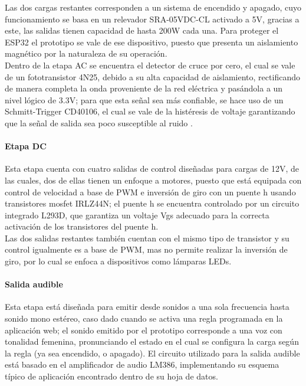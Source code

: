 		Las dos cargas restantes corresponden a un sistema de encendido y apagado, cuyo funcionamiento se basa en un relevador SRA-05VDC-CL activado a 5V, gracias a este, las salidas tienen capacidad de hasta 200W cada una. Para proteger el ESP32 el prototipo se vale de ese dispositivo, puesto que presenta un aislamiento magnético por la naturaleza de su operación.\\
			
		Dentro de la etapa AC se encuentra el detector de cruce por cero, el cual se vale de un fototransistor 4N25, debido a su alta capacidad de aislamiento, rectificando de manera completa la onda proveniente de la red eléctrica y pasándola a un nivel lógico de 3.3V; para que esta señal sea más confiable, se hace uso de un Schmitt-Trigger CD40106, el cual se vale de la histéresis de voltaje garantizando que la señal de salida sea poco susceptible al ruido \cite{DC0}.\\
	
	\paragraph{Etapa DC}
		Esta etapa cuenta con cuatro salidas de control diseñadas para cargas de 12V, de las cuales, dos de ellas tienen un enfoque a motores, puesto que está equipada con control de velocidad a base de PWM e inversión de giro con un puente h usando transistores mosfet IRLZ44N; el puente h se encuentra controlado por un circuito integrado L293D, que garantiza un voltaje Vgs adecuado para la correcta activación de los transistores del puente h.\\
		
		Las dos salidas restantes también cuentan con el mismo tipo de transistor y su control igualmente es a base de PWM, mas no permite realizar la inversión de giro, por lo cual se enfoca a dispositivos como lámparas LEDs.\\
	
	\paragraph{Salida audible}
		Esta etapa está diseñada para emitir desde sonidos a una sola frecuencia hasta sonido mono estéreo, caso dado cuando se activa una regla programada en la aplicación web; el sonido emitido por el prototipo corresponde a una voz con tonalidad femenina, pronunciando el estado en el cual se configura la carga según la regla (ya sea encendido, o apagado). El circuito utilizado para la salida audible está basado en el amplificador de audio LM386, implementando su esquema típico de aplicación encontrado dentro de su hoja de datos.\cite{LM386}\\	
				
